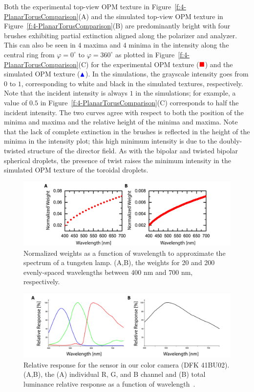 Both the experimental top-view OPM texture in Figure~\ref{f:4-PlanarTorusComparison}(A) and the simulated top-view OPM texture in Figure~\ref{f:4-PlanarTorusComparison}(B) are predominantly bright with four brushes exhibiting partial extinction aligned along the polarizer and analyzer.
This can also be seen in $4$ maxima and $4$ minima in the intensity along the central ring from $\varphi=0^{\circ}$ to $\varphi=360^{\circ}$ as plotted in Figure~\ref{f:4-PlanarTorusComparison}(C) for the experimental OPM texture ($\color{red}\blacksquare$) and the simulated OPM texture ($\color{blue}\blacktriangle$).
In the simulations, the grayscale intensity goes from $0$ to $1$, corresponding to white and black in the simulated textures, respectively.
Note that the incident intensity is always $1$ in the simulations; for example, a value of $0.5$ in Figure~\ref{f:4-PlanarTorusComparison}(C) corresponds to half the incident intensity.
The two curves agree with respect to both the position of the minima and maxima and the relative height of the minima and maxima.
Note that the lack of complete extinction in the brushes is reflected in the height of the minima in the intensity plot; this high minimum intensity is due to the doubly-twisted structure of the director field.
As with the bipolar and twisted bipolar spherical droplets, the presence of twist raises the minimum intensity in the simulated OPM texture of the toroidal droplets.
\begin{figure}
  \includegraphics{figures/C4/Ch4-Figs_Spectrum.png}
  \caption{Normalized weights as a function of wavelength to approximate the spectrum of a tungsten lamp.
  (A,B), the weights for 20 and 200 evenly-spaced wavelengths between 400 nm and 700 nm, respectively.}\label{f:4-Spectrum}
\end{figure}
\begin{figure}
  \includegraphics{figures/C4/Ch4-Figs_CameraResponse.png}
  \caption{Relative response for the sensor in our color camera (DFK 41BU02).
  (A,B), the (A) individual R, G, and B channel and (B) total luminance relative response as a function of wavelength~\cite{camera}.
  }\label{f:4-CameraResponse}
\end{figure}

